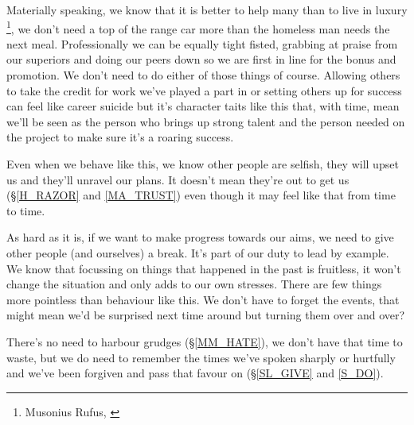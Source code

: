 \cleardoublepage
{\small

Materially speaking, we know that it is better to help many than to live in luxury \footnote{Musonius Rufus, \cite{RLS}}, we don't need a top of the range car more than the homeless man needs the next meal. Professionally we can be equally tight fisted, grabbing at praise from our superiors and doing our peers down so we are first in line for the bonus and promotion. We don't need to do either of those things of course. Allowing others to take the credit for work we've played a part in or setting others up for success can feel like career suicide but it's character taits like this that, with time, mean we'll be seen as the person who brings up strong talent and the person needed on the project to make sure it's a roaring success.

Even when we behave like this, we know other people are selfish, they will upset us and they'll unravel our plans. It doesn't mean they're out to get us (\S \ref{H_RAZOR} and \ref{MA_TRUST}) even though it may feel like that from time to time.

As hard as it is, if we want to make progress towards our aims, we need to give other people (and ourselves) a break. It's part of our duty to lead by example. We know that focussing on things that happened in the past is fruitless, it won't change the situation and only adds to our own stresses. There are few things more pointless than behaviour like this. We don't have to forget the events, that might mean we'd be surprised next time around but turning them over and over?

There's no need to harbour grudges (\S \ref{MM_HATE}), we don't have that time to waste, but we do need to remember the times we've spoken sharply or hurtfully and we've been forgiven and pass that favour on (\S \ref{SL_GIVE} and \ref{S_DO}). 

}
